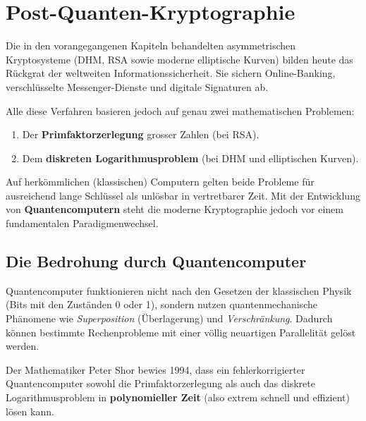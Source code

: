 \chapter{Post-Quanten-Kryptographie}\label{chap:post-quanten-kryptographie}

Die in den vorangegangenen Kapiteln behandelten asymmetrischen Kryptosysteme (\gls{DHM}, \gls{RSA} sowie moderne elliptische Kurven) bilden heute das Rückgrat der weltweiten Informationssicherheit. Sie sichern Online-Banking, verschlüsselte Messenger-Dienste und digitale Signaturen ab.

Alle diese Verfahren basieren jedoch auf genau zwei mathematischen Problemen:
\begin{enumerate}
	\item Der \textbf{Primfaktorzerlegung} grosser Zahlen (bei \gls{RSA}).
	\item Dem \textbf{diskreten Logarithmusproblem} (bei \gls{DHM} und elliptischen Kurven).
\end{enumerate}

Auf herkömmlichen (klassischen) Computern gelten beide Probleme für ausreichend lange Schlüssel als unlösbar in vertretbarer Zeit. Mit der Entwicklung von \textbf{Quantencomputern} steht die moderne Kryptographie jedoch vor einem fundamentalen Paradigmenwechsel.

\section{Die Bedrohung durch Quantencomputer}

Quantencomputer funktionieren nicht nach den Gesetzen der klassischen Physik (Bits mit den Zuständen 0 oder 1), sondern nutzen quantenmechanische Phänomene wie \emph{Superposition} (Überlagerung) und \emph{Verschränkung}. Dadurch können bestimmte Rechenprobleme mit einer völlig neuartigen Parallelität gelöst werden.

\begin{myidea}
	Der Mathematiker Peter Shor bewies 1994, dass ein fehlerkorrigierter Quantencomputer sowohl die Primfaktorzerlegung als auch das diskrete Logarithmusproblem in \textbf{polynomieller Zeit} (also extrem schnell und effizient) lösen kann.
\end{myidea}

